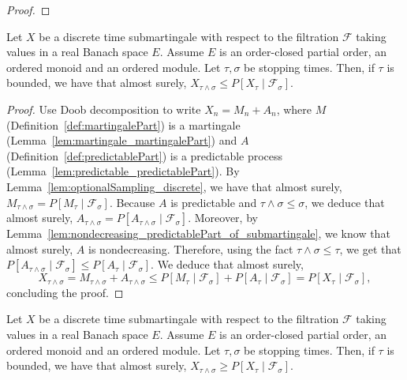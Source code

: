 \begin{proof}\leanok

\end{proof}

\begin{lemma}\label{lem:optionalSampling_discrete_submartingale}
  \leanok
Let $X$ be a discrete time submartingale with respect to the filtration $\mathcal{F}$ taking values in a real Banach space $E$. Assume $E$ is an order-closed partial order, an ordered monoid and an ordered module. Let $\tau, \sigma$ be stopping times. Then, if $\tau$ is bounded, we have that almost surely, $X_{\tau \wedge \sigma} \le P[X_{\tau} \mid \mathcal{F}_{\sigma}]$.
\end{lemma}

\begin{proof}
Use Doob decomposition to write $X_n = M_n + A_n$, where $M$ (Definition~\ref{def:martingalePart}) is a martingale (Lemma~\ref{lem:martingale_martingalePart}) and $A$ (Definition~\ref{def:predictablePart}) is a predictable process (Lemma~\ref{lem:predictable_predictablePart}). By Lemma~\ref{lem:optionalSampling_discrete}, we have that almost surely, $M_{\tau \wedge \sigma} = P[M_{\tau} \mid \mathcal{F}_{\sigma}]$. Because $A$ is predictable and $\tau \wedge \sigma \le \sigma$, we deduce that almost surely, $A_{\tau \wedge \sigma} = P[A_{\tau \wedge \sigma} \mid \mathcal{F}_\sigma]$. Moreover, by Lemma~\ref{lem:nondecreasing_predictablePart_of_submartingale}, we know that almost surely, $A$ is nondecreasing. Therefore, using the fact $\tau \wedge \sigma \le \tau$, we get that $P[A_{\tau \wedge \sigma} \mid \mathcal{F}_\sigma] \le P[A_\tau \mid \mathcal{F}_\sigma]$. We deduce that almost surely,
$$X_{\tau \wedge \sigma} = M_{\tau \wedge \sigma} + A_{\tau \wedge \sigma} \le P[M_\tau \mid \mathcal{F}_\sigma] + P[A_\tau \mid \mathcal{F}_\sigma] = P[X_\tau \mid \mathcal{F}_\sigma],$$
concluding the proof.
\end{proof}

\begin{lemma}\label{lem:optionalSampling_discrete_supermartingale}
  \leanok
Let $X$ be a discrete time submartingale with respect to the filtration $\mathcal{F}$ taking values in a real Banach space $E$. Assume $E$ is an order-closed partial order, an ordered monoid and an ordered module. Let $\tau, \sigma$ be stopping times. Then, if $\tau$ is bounded, we have that almost surely, $X_{\tau \wedge \sigma} \ge P[X_{\tau} \mid \mathcal{F}_{\sigma}]$.
\end{lemma}

